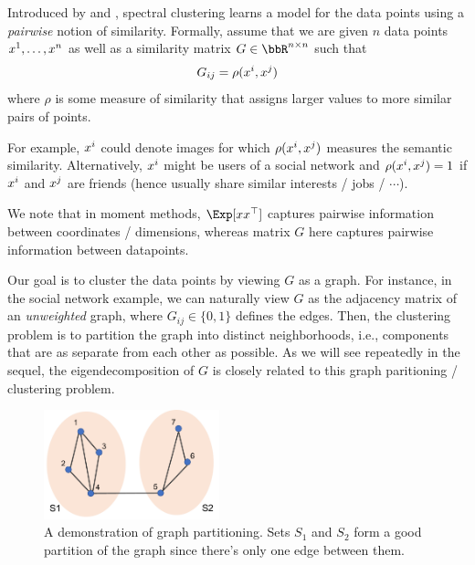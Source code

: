 Introduced by \citet{shi2000normalized} and \citet{ng2001spectral}, spectral clustering learns a model for the data points using a \emph{pairwise} notion of similarity. Formally, assume that we are given $n$ data points $x\sp{1}, \dots, x\sp{n}$ as well as a similarity matrix $G \in \bbR^{n\times n}$ such that 
\begin{equation}
    G_{ij} = \rho (x\sp{i}, x\sp{j})
\end{equation}
where $\rho$ is some measure of similarity that assigns larger values to more similar pairs of points. 

For example, $x\sp{i}$ could denote images for which $\rho (x\sp{i}, x\sp{j})$ measures the semantic similarity. Alternatively, $x\sp{i}$ might be users of a social network and $\rho (x\sp{i}, x\sp{j}) = 1$ if $x\sp{i}$ and $x\sp{j}$ are friends (hence usually share similar interests / jobs / $\cdots$). 

We note that in moment methods, $\Exp[xx^\top]$ captures pairwise information between coordinates / dimensions, whereas matrix $G$ here captures pairwise information between datapoints.

Our goal is to cluster the data points by viewing $G$ as a graph. For instance, in the social network example, we can naturally view $G$ as the adjacency matrix of an \emph{unweighted} graph, where $G_{ij} \in \{0, 1\}$ defines the edges. Then, the clustering problem is to partition the graph into distinct neighborhoods, i.e., components that are as separate from each other as possible. As we will see repeatedly in the sequel, the eigendecomposition of $G$ is closely related to this graph paritioning / clustering problem.

\begin{figure}[ht]
	\centering
	\includegraphics[width=2in]{figures/ssl1.pdf}
	\caption{A demonstration of graph partitioning. Sets $S_1$ and $S_2$ form a good partition of the graph since there's only one edge between them.}
\end{figure}


